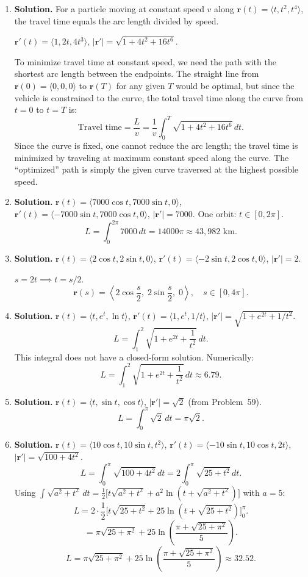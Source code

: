 \begin{enumerate}
\item \textbf{Solution.}
For a particle moving at constant speed $v$ along $\mathbf{r}(t)=\langle t, t^2, t^4\rangle$, the travel time equals the arc length divided by speed.

$\mathbf{r}'(t)=\langle 1, 2t, 4t^3\rangle$, $|\mathbf{r}'|=\sqrt{1+4t^2+16t^6}$.

To minimize travel time at constant speed, we need the path with the shortest arc length between the endpoints. The straight line from $\mathbf{r}(0)=\langle 0,0,0\rangle$ to $\mathbf{r}(T)$ for any given $T$ would be optimal, but since the vehicle is constrained to the curve, the total travel time along the curve from $t=0$ to $t=T$ is:
\[
\boxed{\text{Travel time} = \frac{L}{v}=\frac{1}{v}\int_0^T\sqrt{1+4t^2+16t^6}\,dt.}
\]
Since the curve is fixed, one cannot reduce the arc length; the travel time is minimized by traveling at maximum constant speed along the curve. The ``optimized'' path is simply the given curve traversed at the highest possible speed.

\item \textbf{Solution.}
$\mathbf{r}(t)=\langle 7000\cos t, 7000\sin t, 0\rangle$, $\mathbf{r}'(t)=\langle -7000\sin t, 7000\cos t, 0\rangle$, $|\mathbf{r}'|=7000$.
One orbit: $t\in[0,2\pi]$.
\[
\boxed{L=\int_0^{2\pi}7000\,dt = 14000\pi \approx 43{,}982\text{ km}.}
\]

\item \textbf{Solution.}
$\mathbf{r}(t)=\langle 2\cos t, 2\sin t, 0\rangle$, $\mathbf{r}'(t)=\langle -2\sin t, 2\cos t, 0\rangle$, $|\mathbf{r}'|=2$.

$s=2t \implies t=s/2$.
\[
\boxed{\mathbf{r}(s)=\left\langle 2\cos\frac{s}{2},\; 2\sin\frac{s}{2},\; 0\right\rangle,\quad s\in[0,4\pi].}
\]

\item \textbf{Solution.}
$\mathbf{r}(t)=\langle t, e^t, \ln t\rangle$, $\mathbf{r}'(t)=\langle 1, e^t, 1/t\rangle$, $|\mathbf{r}'|=\sqrt{1+e^{2t}+1/t^2}$.
\[
L=\int_1^2\sqrt{1+e^{2t}+\frac{1}{t^2}}\,dt.
\]
This integral does not have a closed-form solution. Numerically:
\[
\boxed{L=\int_1^2\sqrt{1+e^{2t}+\frac{1}{t^2}}\,dt \approx 6.79.}
\]

\item \textbf{Solution.}
$\mathbf{r}(t)=\langle t, \sin t, \cos t\rangle$, $|\mathbf{r}'|=\sqrt{2}$ (from Problem~59).
\[
\boxed{L=\int_0^{\pi}\sqrt{2}\,dt = \pi\sqrt{2}.}
\]

\item \textbf{Solution.}
$\mathbf{r}(t)=\langle 10\cos t, 10\sin t, t^2\rangle$, $\mathbf{r}'(t)=\langle -10\sin t, 10\cos t, 2t\rangle$, $|\mathbf{r}'|=\sqrt{100+4t^2}$.
\[
L=\int_0^{\pi}\sqrt{100+4t^2}\,dt = 2\int_0^{\pi}\sqrt{25+t^2}\,dt.
\]
Using $\int\sqrt{a^2+t^2}\,dt=\frac{1}{2}\bigl[t\sqrt{a^2+t^2}+a^2\ln(t+\sqrt{a^2+t^2})\bigr]$ with $a=5$:
\[
L = 2\cdot\frac{1}{2}\bigl[t\sqrt{25+t^2}+25\ln(t+\sqrt{25+t^2})\bigr]_0^{\pi}.
\]
\[
= \pi\sqrt{25+\pi^2}+25\ln\!\left(\frac{\pi+\sqrt{25+\pi^2}}{5}\right).
\]
\[
\boxed{L=\pi\sqrt{25+\pi^2}+25\ln\!\left(\frac{\pi+\sqrt{25+\pi^2}}{5}\right)\approx 32.52.}
\]


\end{enumerate}
